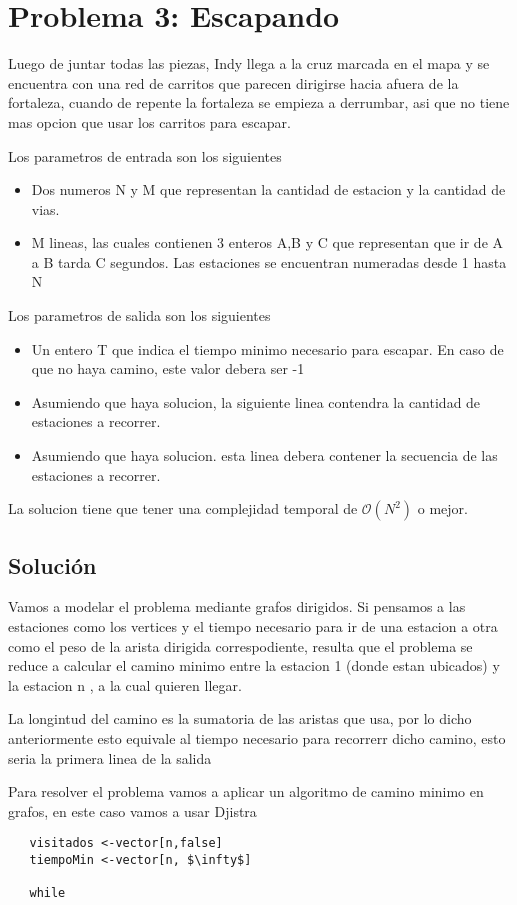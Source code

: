 \section{Problema 3: Escapando}

Luego de juntar todas las piezas, Indy llega a la cruz marcada en el mapa y se encuentra con una red de carritos que parecen dirigirse hacia afuera de la fortaleza, cuando de repente la fortaleza se empieza a derrumbar, asi que no tiene mas opcion que usar los carritos para escapar.

Los parametros de entrada son los siguientes

	\begin{itemize}
		\item Dos numeros N y M que representan la cantidad de estacion y la cantidad de vias.
		\item M lineas, las cuales contienen 3 enteros A,B y C que representan que ir de A a B tarda C segundos. Las estaciones se encuentran numeradas desde 1 hasta N
    \end{itemize}

Los parametros de salida son los siguientes

	\begin{itemize}
	\item Un entero T que indica el tiempo minimo necesario para escapar. En caso de que no haya camino, este valor debera ser -1
	\item Asumiendo que haya solucion, la siguiente linea contendra la cantidad de estaciones a recorrer.
	\item Asumiendo que haya solucion. esta linea debera contener la secuencia de las estaciones a recorrer.

	\end{itemize}	

La solucion tiene que tener una complejidad temporal de $\mathcal{O}(N^{2})$ o mejor.

\subsection{Solución}

Vamos a modelar el problema mediante grafos dirigidos. Si pensamos a las estaciones como los vertices y el tiempo necesario para ir de una estacion a otra como el peso de la arista dirigida correspodiente, resulta que el problema se reduce a calcular el camino minimo entre la estacion 1 (donde estan ubicados) y la estacion n , a la cual quieren llegar.

La longintud del camino es la sumatoria de las aristas que usa, por lo dicho anteriormente esto equivale al tiempo necesario para recorrerr dicho camino, esto seria la primera linea de la salida

Para resolver el problema vamos a aplicar un algoritmo de camino minimo en grafos, en este caso vamos a usar Djistra

   \begin{lstlisting}
   visitados <-vector[n,false]
   tiempoMin <-vector[n, $\infty$]

   while

   \end{lstlisting}


